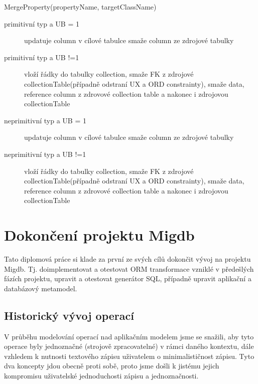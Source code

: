 \documentclass[11pt,twoside,a4paper]{book}
\begin{document}
\begin{list}{Operace :}{}
\item MergeProperty(propertyName, targetClassName) 
\begin{description}
	\item[primitivní typ a UB = 1] updatuje column v cílové tabulce smaže column ze
	zdrojové tabulky
	\item[primitivní typ a UB !=1] vloží řádky do tabulky collection, smaže FK
	z zdrojové collectionTable(případně odstraní UX a ORD
	constrainty), smaže data, reference column z zdrovové
	collection table a nakonec i zdrojovou collectionTable
	\item[neprimitivní typ a UB = 1] updatuje column v cílové tabulce smaže column ze
	zdrojové tabulky
	\item[neprimitivní typ a UB !=1] vloží řádky do tabulky collection, smaže FK
	z zdrojové collectionTable(případně odstraní UX a ORD
	constrainty), smaže data, reference column z zdrovové
	collection table a nakonec i zdrojovou collectionTable
\end{description}
  
\end{list}

\chapter{Dokončení projektu Migdb}
Tato diplomová práce si klade za první ze svých cílů dokončit vývoj na projektu
Migdb.
Tj. doimplementovat a otestovat ORM transformace vzniklé v předešlých fázích
projektu, upravit a otestovat generátor SQL, případně upravit aplikační a
databázový metamodel.

\section{Historický vývoj operací}

V průběhu modelování operací nad aplikačním modelem jsme se snažili, aby tyto
operace byly jednoznačné (strojově zpracovatelné) v rámci daného kontextu, dále
vzhledem k nutnosti textového zápisu uživatelem o minimalističnost zápisu. Tyto
dva koncepty jdou obecně proti sobě, proto jsme došli k jistému jejich
kompromisu uživatelské jednoduchosti zápisu a jednoznačnosti.
\end{document}

